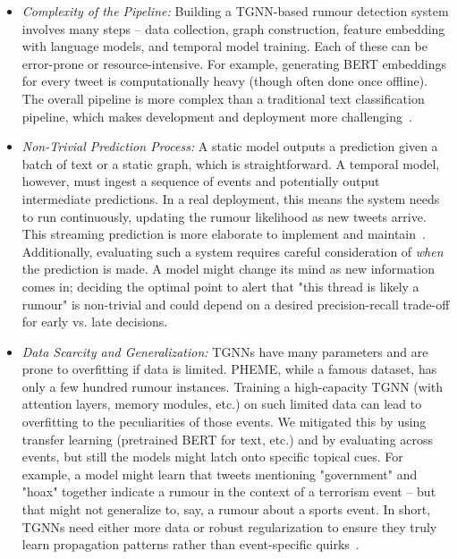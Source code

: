 \documentclass{cshonours}
\begin{document}
\begin{itemize}
\item \emph{Complexity of the Pipeline:} Building a TGNN-based rumour detection system involves many steps – data collection, graph construction, feature embedding with language models, and temporal model training. Each of these can be error-prone or resource-intensive. For example, generating BERT embeddings for every tweet is computationally heavy (though often done once offline). The overall pipeline is more complex than a traditional text classification pipeline, which makes development and deployment more challenging~\cite{Li2023Zebra}.

\item \emph{Non-Trivial Prediction Process:} A static model outputs a prediction given a batch of text or a static graph, which is straightforward. A temporal model, however, must ingest a sequence of events and potentially output intermediate predictions. In a real deployment, this means the system needs to run continuously, updating the rumour likelihood as new tweets arrive. This streaming prediction is more elaborate to implement and maintain~\cite{Wang2025Challenging}. Additionally, evaluating such a system requires careful consideration of \textit{when} the prediction is made. A model might change its mind as new information comes in; deciding the optimal point to alert that "this thread is likely a rumour" is non-trivial and could depend on a desired precision-recall trade-off for early vs. late decisions.

\item \emph{Data Scarcity and Generalization:} TGNNs have many parameters and are prone to overfitting if data is limited. PHEME, while a famous dataset, has only a few hundred rumour instances. Training a high-capacity TGNN (with attention layers, memory modules, etc.) on such limited data can lead to overfitting to the peculiarities of those events. We mitigated this by using transfer learning (pretrained BERT for text, etc.) and by evaluating across events, but still the models might latch onto specific topical cues. For example, a model might learn that tweets mentioning "government" and "hoax" together indicate a rumour in the context of a terrorism event – but that might not generalize to, say, a rumour about a sports event. In short, TGNNs need either more data or robust regularization to ensure they truly learn propagation patterns rather than event-specific quirks~\cite{Wang2025Challenging}.


\end{itemize}
\end{document}
